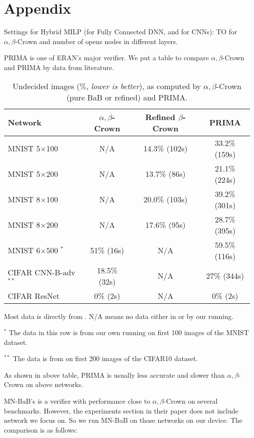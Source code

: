 \section*{Appendix}

Settings for Hybrid MILP (for Fully Connected DNN, and for CNNs): TO for $\alpha,\beta$-Crown
and number of opens nodes in different layers.


PRIMA is one of ERAN's major verifier. We put a table to compare $\alpha,\beta$-Crown and PRIMA by data from literature. 

\begin{table}[h!]
	\centering
	\caption{Undecided images ($\%$, {\em lower is better}), as computed by $\alpha,\beta$-Crown (pure BaB or refined) and PRIMA. }
	\begin{tabular}{||l||c|c||c||}
		\hline \hline
		Network & $\alpha,\beta$-Crown & Refined $\beta$-Crown & PRIMA \\ 		  
		\hline
		MNIST 5$\times$100 & N/A  & 14.3\% (102s) & 33.2\% (159s)\\ \hline
		MNIST 5$\times$200 & N/A & 13.7\% (86s) & 21.1\% (224s) \\ \hline
		MNIST 8$\times$100 & N/A  & 20.0\% (103s) & 39.2\% (301s)   \\ \hline
		MNIST 8$\times$200 & N/A & 17.6\% (95s) & 28.7\% (395s)  \\ \hline
		MNIST 6$\times$500 $^*$ & 51\% (16s) & N/A & 59.5\% (116s) \\ \hline
		CIFAR CNN-B-adv $^{**}$& 18.5\% (32s) & N/A & 27\% (344s)\\ \hline \hline
		CIFAR ResNet & 0\% (2s) & N/A & 0\% (2s) \\ \hline \hline
	\end{tabular}
	\begin{tablenotes}
		\footnotesize
		\item Most data is directly from \cite{crown}. N/A means no data either in \cite{crown} or by our running.
		\item  $^*$ The data in this row is from our own running on first 100 images of the MNIST dataset.
		\item  $^{**}$ The data is from \cite{crown} on first 200 images of the CIFAR10 dataset.
	\end{tablenotes}
	\end{table}
As shown in above table, PRIMA is usually less accurate and slower than $\alpha,\beta$-Crown on above networks.


MN-BaB's is a verifier with performance close to $\alpha,\beta$-Crown on several benchmarks. However, the experiments section in their paper does not include network we focus on. So we run MN-BaB on those networks on our device. The comparison is as follows:


